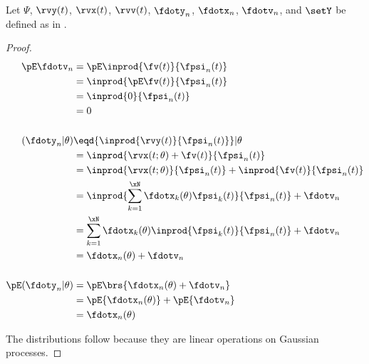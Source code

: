 \begin{theorem}%
\label{thm:agn_stats}
Let $\Psi$, $\rvy(t)$, $\rvx(t)$, $\rvv(t)$, $\fdoty_n$, $\fdotx_n$, $\fdotv_n$, and $\setY$ be defined as in .
\end{theorem}
\begin{proof}
\begin{align*}
   \pE\fdotv_{n}
     &= \pE\inprod{\fv(t)}{\fpsi_n(t)}
   \\&= \inprod{\pE\fv(t)}{\fpsi_n(t)}
   \\&= \inprod{0}{\fpsi_n(t)}
   \\&= 0
\\
\\
   (\fdoty_n |\theta)
     &\eqd {\inprod{\rvy(t)}{\fpsi_n(t)}}  |\theta
   \\&=    {\inprod{\rvx(t;\theta)+\fv(t)}{\fpsi_n(t)}}
   \\&=    {\inprod{\rvx(t;\theta)}{\fpsi_n(t)}} +   {\inprod{\fv(t)}{\fpsi_n(t)}}
   \\&=    \inprod{\sum_{k=1}^\xN \fdotx_k(\theta) \fpsi_k(t)}{\fpsi_n(t)} + \fdotv_n
   \\&=    \sum_{k=1}^\xN \fdotx_k(\theta) \inprod{\fpsi_k(t)}{\fpsi_n(t)} + \fdotv_n
   \\&=    \fdotx_n(\theta)  + \fdotv_n
\\ \\
   \pE({\fdoty_n} | \theta)
     &= \pE\brs{\fdotx_n(\theta)  + \fdotv_n}
   \\&= \pE{\fdotx_n(\theta) } +   \pE{\fdotv_n}
   \\&= \fdotx_n(\theta)
\end{align*}

The distributions follow because they are linear operations on
Gaussian processes.
\end{proof}

